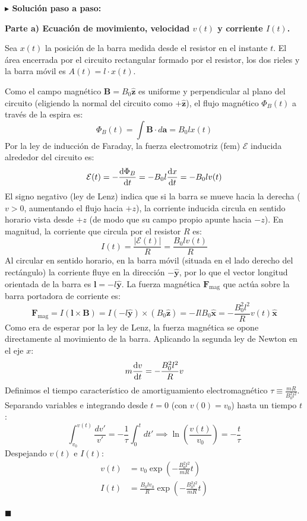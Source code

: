 \documentclass[11pt,a4paper]{book}
\newenvironment{solucion}{%
    \par\medskip\noindent\textbf{\color{blue!65!black}\Large $\blacktriangleright$ Solución paso a paso:}\par\medskip
}{%
    \hfill$\blacksquare$\par\bigskip
}
\newcommand{\xhat}{\hat{\bm{x}}}
\newcommand{\yhat}{\hat{\bm{y}}}
\newcommand{\zhat}{\hat{\bm{z}}}
\newcommand{\Bvec}{\bm{B}}
\begin{document}
\begin{solucion}
\textbf{Parte a) Ecuación de movimiento, velocidad $v(t)$ y corriente $I(t)$.}

Sea $x(t)$ la posición de la barra medida desde el resistor en el instante $t$. El área encerrada por el circuito rectangular formado por el resistor, los dos rieles y la barra móvil es $A(t) = l \cdot x(t)$.

Como el campo magnético $\Bvec = B_0 \zhat$ es uniforme y perpendicular al plano del circuito (eligiendo la normal del circuito como $+\zhat$), el flujo magnético $\Phi_B(t)$ a través de la espira es:
\begin{equation}
    \Phi_B(t) = \int \Bvec \cdot d\bm{a} = B_0 l x(t)
\end{equation}
Por la ley de inducción de Faraday, la fuerza electromotriz (fem) $\mathcal{E}$ inducida alrededor del circuito es:
\begin{equation}
    \mathcal{E}(t) = -\dv{\Phi_B}{t} = -B_0 l \dv{x}{t} = -B_0 l v(t)
\end{equation}
El signo negativo (ley de Lenz) indica que si la barra se mueve hacia la derecha ($v > 0$, aumentando el flujo hacia $+z$), la corriente inducida circula en sentido horario vista desde $+z$ (de modo que su campo propio apunte hacia $-z$). En magnitud, la corriente que circula por el resistor $R$ es:
\begin{equation}
    I(t) = \frac{|\mathcal{E}(t)|}{R} = \frac{B_0 l v(t)}{R}
\end{equation}
Al circular en sentido horario, en la barra móvil (situada en el lado derecho del rectángulo) la corriente fluye en la dirección $-\yhat$, por lo que el vector longitud orientada de la barra es $\bm{l} = -l\yhat$. La fuerza magnética $\bm{F}_{\text{mag}}$ que actúa sobre la barra portadora de corriente es:
\begin{equation}
    \bm{F}_{\text{mag}} = I (\bm{l} \times \Bvec) = I (-l\yhat) \times (B_0 \zhat) = -I l B_0 \xhat = -\frac{B_0^2 l^2}{R} v(t) \xhat
\end{equation}
Como era de esperar por la ley de Lenz, la fuerza magnética se opone directamente al movimiento de la barra. Aplicando la segunda ley de Newton en el eje $x$:
\begin{equation}
    m \dv{v}{t} = -\frac{B_0^2 l^2}{R} v
\end{equation}
Definimos el tiempo característico de amortiguamiento electromagnético $\tau \equiv \frac{mR}{B_0^2 l^2}$. Separando variables e integrando desde $t=0$ (con $v(0) = v_0$) hasta un tiempo $t$:
\begin{equation}
    \int_{v_0}^{v(t)} \frac{dv'}{v'} = -\frac{1}{\tau} \int_{0}^{t} dt' \implies \ln\left(\frac{v(t)}{v_0}\right) = -\frac{t}{\tau}
\end{equation}
Despejando $v(t)$ e $I(t)$:
\begin{align}
    v(t) &= v_0 \exp\left(-\frac{B_0^2 l^2}{m R} t\right) \\
    I(t) &= \frac{B_0 l v_0}{R} \exp\left(-\frac{B_0^2 l^2}{m R} t\right)
\end{align}


\end{solucion}
\end{document}
